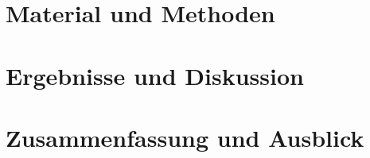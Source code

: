 \documentclass[%
	BCOR12mm, %
	cleardoublepage=empty, %
	tablecaptionabove, %
	toc=bib, %
	toc=listofnumbered, %
	listof=leveldown, %
	numbers=noendperiod %
	]{scrbook}
\renewcommand\appendix{\par
	\addchap{\appendixname}
	\setcounter{section}{0}%
	\setcounter{subsection}{0}%
	\setcounter{figure}{0}%
	\renewcommand\thesection{\Alph{section}}%
	\renewcommand\thefigure{\Alph{section}.\arabic{figure}} 
	\renewcommand\thetable{\Alph{section}.\arabic{table}}}
\begin{document}

\chapter{Material und Methoden} %
\label{cha:material_und_methoden}


\chapter{Ergebnisse und Diskussion} %
\label{cha:ergebnisse_und_diskussion}


\chapter{Zusammenfassung und Ausblick} %
\label{cha:zusammenfassung_und_ausblick}





\appendix

\listoffigures

\listoftables
\end{document}
